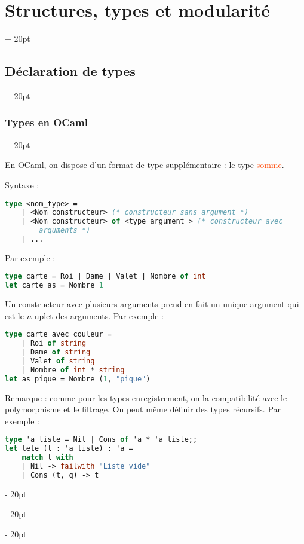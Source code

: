 \documentclass[a4paper, 12pt, twoside]{article}
\renewcommand{\emph}{\textcolor{ff4500}}
\newcommand{\ind}[1][20pt]{\advance\leftskip + #1}
\newcommand{\deind}[1][20pt]{\advance\leftskip - #1}
\newenvironment{indt}[2][20pt]{#2 \par \ind[#1]}{\par \deind} %
\begin{document}
\begin{indt}{\section{Structures, types et modularité}}
\begin{indt}{\subsection{Déclaration de types}}
\begin{indt}{\subsubsection{Types en OCaml}}
                \vspace{6pt}
                
                En OCaml, on dispose d’un format de type supplémentaire : le type \emph{somme}.
                
                Syntaxe :
                \begin{lstlisting}[language=Caml, xleftmargin=80pt]
type <nom_type> =
    | <Nom_constructeur> (* constructeur sans argument *)
    | <Nom_constructeur> of <type_argument > (* constructeur avec
        arguments *)
    | ...\end{lstlisting}
                
                Par exemple :
                \begin{lstlisting}[language=Caml, xleftmargin=80pt]
type carte = Roi | Dame | Valet | Nombre of int
let carte_as = Nombre 1\end{lstlisting}
                
                \vspace{6pt}
                
                Un constructeur avec plusieurs arguments prend en fait un unique argument qui est le $n$-uplet des arguments. Par exemple :
                
                \begin{lstlisting}[language=Caml, xleftmargin=80pt]
type carte_avec_couleur =
    | Roi of string
    | Dame of string
    | Valet of string
    | Nombre of int * string
let as_pique = Nombre (1, "pique")\end{lstlisting}
                
                \vspace{6pt}
                
                Remarque : comme pour les types enregistrement, on la compatibilité avec le polymorphisme et le filtrage. On peut même définir des types récursifs. Par exemple :
                \label{1.3.2}
                \begin{lstlisting}[language=Caml, xleftmargin=80pt]
type 'a liste = Nil | Cons of 'a * 'a liste;;
let tete (l : 'a liste) : 'a =
    match l with
    | Nil -> failwith "Liste vide"
    | Cons (t, q) -> t\end{lstlisting}
            \end{indt}
        \end{indt}
        
    \end{indt}
    
\end{document}
